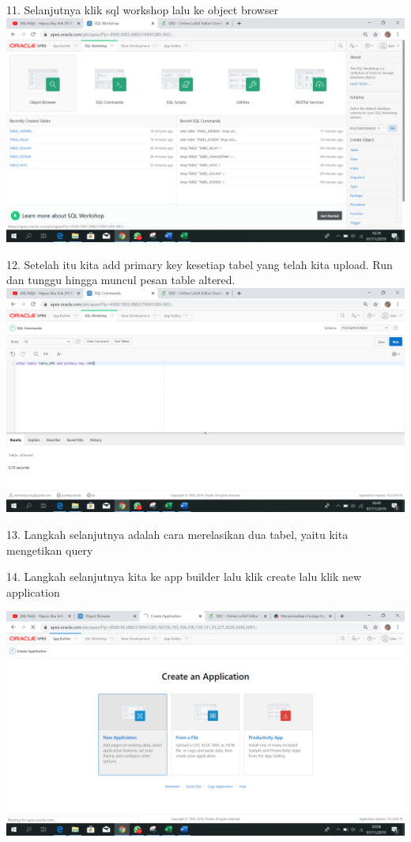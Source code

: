 \documentclass{article}
\begin{document}
\item 11. Selanjutnya klik sql workshop lalu ke object browser\\
    \includegraphics[width=15cm\textwidth]{figure/objectbrow.png}

\item 12.  Setelah itu kita add primary key kesetiap tabel yang telah kita upload. Run dan tunggu hingga muncul pesan table altered.\\

\includegraphics[width=15cm\textwidth]{figure/addpk.png}

\item 13.  Langkah selanjutnya adalah cara merelasikan dua tabel, yaitu kita mengetikan query\\

\item 14. Langkah selanjutnya kita ke app builder lalu klik create lalu klik new application 

\includegraphics[width=15cm\textwidth]{figure/createapp.png}
\end{document}
